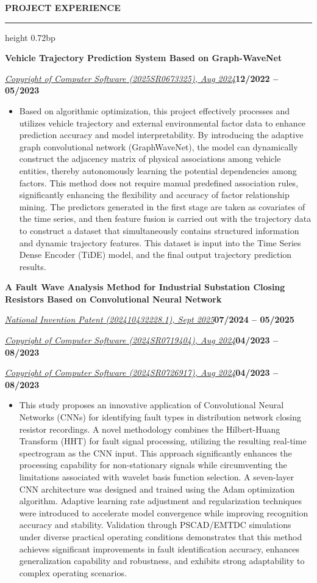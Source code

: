 \documentclass[10pt,a4paper]{article}
\newcommand{\sectionrule}[1]{%
  \par\vspace{1.80bp}\noindent\textbf{#1}\par\vspace{2.62bp}%
  \hrule height 0.72bp\vspace{1.80bp}%
}
\let\compactsectionrule\sectionrule
\newcommand{\titleline}[1]{\par\vspace{0.80bp}\noindent\textbf{#1}\par\vspace{0.50bp}}
\newcommand{\metaline}[2]{%
  \par\noindent\uline{\textit{#1}}\hfill\textbf{#2}\par\vspace{0.50bp}%
}
\let\venueline\metaline
\newenvironment{cvitems}{%
  \begin{itemize}[leftmargin=14.20bp,labelwidth=4.20bp,labelsep=10.00bp,align=left,
    topsep=0bp,itemsep=0bp,parsep=0bp,partopsep=0bp,label={\textbullet}]
}{\end{itemize}}
\begin{document}
\compactsectionrule{PROJECT EXPERIENCE}
\titleline{Vehicle Trajectory Prediction System Based on Graph-WaveNet}
\venueline{Copyright of Computer Software (2025SR0673325), Aug 2024}{12/2022 -- 05/2023}
\begin{cvitems}
\item Based on algorithmic optimization, this project effectively processes and utilizes vehicle trajectory and external environmental factor data to enhance prediction accuracy and model interpretability. By introducing the adaptive graph convolutional network (GraphWaveNet), the model can dynamically construct the adjacency matrix of physical associations among vehicle entities, thereby autonomously learning the potential dependencies among factors. This method does not require manual predefined association rules, significantly enhancing the flexibility and accuracy of factor relationship mining. The predictors generated in the first stage are taken as covariates of the time series, and then feature fusion is carried out with the trajectory data to construct a dataset that simultaneously contains structured information and dynamic trajectory features. This dataset is input into the Time Series Dense Encoder (TiDE) model, and the final output trajectory prediction results.
\end{cvitems}

\titleline{A Fault Wave Analysis Method for Industrial Substation Closing Resistors Based on Convolutional Neural Network}
\venueline{National Invention Patent (202410432228.1), Sept 2025}{07/2024 -- 05/2025}
\venueline{Copyright of Computer Software (2024SR0719404), Aug 2024}{04/2023 -- 08/2023}
\venueline{Copyright of Computer Software (2024SR0726917), Aug 2024}{04/2023 -- 08/2023}
\begin{cvitems}
\item This study proposes an innovative application of Convolutional Neural Networks (CNNs) for identifying fault types in distribution network closing resistor recordings. A novel methodology combines the Hilbert-Huang Transform (HHT) for fault signal processing, utilizing the resulting real-time spectrogram as the CNN input. This approach significantly enhances the processing capability for non-stationary signals while circumventing the limitations associated with wavelet basis function selection. A seven-layer CNN architecture was designed and trained using the Adam optimization algorithm. Adaptive learning rate adjustment and regularization techniques were introduced to accelerate model convergence while improving recognition accuracy and stability. Validation through PSCAD/EMTDC simulations under diverse practical operating conditions demonstrates that this method achieves significant improvements in fault identification accuracy, enhances generalization capability and robustness, and exhibits strong adaptability to complex operating scenarios.
\end{cvitems}
\end{document}
